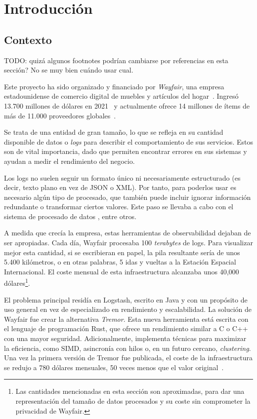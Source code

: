 
\chapter{Introducción}

\section{Contexto}

TODO: quizá algunos footnotes podrían cambiarse por referencias en esta sección?
No se muy bien cuándo usar cual.

Este proyecto ha sido organizado y financiado por \emph{Wayfair}, una empresa
estadounidense de comercio digital de muebles y artículos del
hogar~\cite{wayfair}. Ingresó 13.700 millones de dólares en
2021~\cite{wayfairRevenue} y actualmente ofrece 14 millones de ítems de más de
11.000 proveedores globales~\cite{wayfairItems}.

Se trata de una entidad de gran tamaño, lo que se refleja en su cantidad
disponible de datos o \emph{logs} para describir el comportamiento de sus
servicios. Estos son de vital importancia, dado que permiten encontrar errores
en sus sistemas y ayudan a medir el rendimiento del negocio.

Los logs no suelen seguir un formato único ni necesariamente estructurado (es
decir, texto plano en vez de JSON o XML). Por tanto, para poderlos usar es
necesario algún tipo de procesado, que también puede incluir ignorar información
redundante o transformar ciertos valores. Este paso se llevaba a cabo con el
sistema de procesado de datos , entre otros.

A medida que crecía la empresa, estas herramientas de observabilidad dejaban de
ser apropiadas. Cada día, Wayfair procesaba 100 \emph{terabytes} de logs. Para
visualizar mejor esta cantidad, si se escribieran en papel, la pila resultante
sería de unos 5.400 kilómetros, o en otras palabras, 5 idas y vueltas a la
Estación Espacial Internacional. El coste mensual de esta infraestructura
alcanzaba unos 40,000 dólares\footnote{Las cantidades mencionadas en esta
sección son aproximadas, para dar una representación del tamaño de datos
procesados y su coste sin comprometer la privacidad de Wayfair.}.

El problema principal residía en Logstash, escrito en Java y con un propósito de
uso general en vez de especializado en rendimiento y escalabilidad. La solución
de Wayfair fue crear la alternativa \emph{Tremor}. Esta nueva herramienta está
escrita con el lenguaje de programación Rust, que ofrece un rendimiento similar
a C o C++ con una mayor seguridad. Adicionalmente, implementa técnicas para
maximizar la eficiencia, como SIMD, asincronía con hilos o, en un futuro
cercano, \emph{clustering}. Una vez la primera versión de Tremor fue publicada,
el coste de la infraestructura se redujo a 780 dólares mensuales, 50 veces menos
que el valor original~\cite{tremorcon_lll}.

